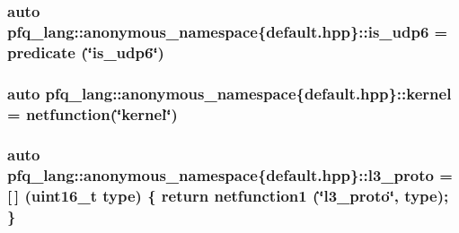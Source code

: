 \hypertarget{namespacepfq__lang_1_1anonymous__namespace_02default_8hpp_03_a31e93829d19f72f4aece81f57d7cef9c}{
\subsubsection[{is\+\_\+udp6}]{\setlength{\rightskip}{0pt plus 5cm}auto pfq\+\_\+lang\+::anonymous\+\_\+namespace\{default.\+hpp\}\+::is\+\_\+udp6 = {\bf predicate} (\char`\"{}is\+\_\+udp6\char`\"{})}}\label{namespacepfq__lang_1_1anonymous__namespace_02default_8hpp_03_a31e93829d19f72f4aece81f57d7cef9c}
\hypertarget{namespacepfq__lang_1_1anonymous__namespace_02default_8hpp_03_a68a2502f951a2b671a7d0496609f5d2a}{
\subsubsection[{kernel}]{\setlength{\rightskip}{0pt plus 5cm}auto pfq\+\_\+lang\+::anonymous\+\_\+namespace\{default.\+hpp\}\+::kernel = {\bf netfunction}(\char`\"{}kernel\char`\"{})}}\label{namespacepfq__lang_1_1anonymous__namespace_02default_8hpp_03_a68a2502f951a2b671a7d0496609f5d2a}
\hypertarget{namespacepfq__lang_1_1anonymous__namespace_02default_8hpp_03_aed01dd5380a873d92397ec0d4c07abac}{
\subsubsection[{l3\+\_\+proto}]{\setlength{\rightskip}{0pt plus 5cm}auto pfq\+\_\+lang\+::anonymous\+\_\+namespace\{default.\+hpp\}\+::l3\+\_\+proto = \mbox{[}$\,$\mbox{]} (uint16\+\_\+t type) \{ return {\bf netfunction1} (\char`\"{}l3\+\_\+proto\char`\"{}, type); \}}}\label{namespacepfq__lang_1_1anonymous__namespace_02default_8hpp_03_aed01dd5380a873d92397ec0d4c07abac}
